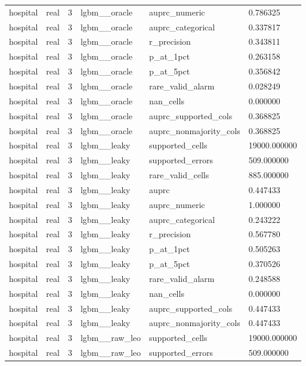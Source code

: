 \begin{tabular}{llllll}
hospital & real & 3 & lgbm\_\_oracle & auprc\_numeric & 0.786325 \\
hospital & real & 3 & lgbm\_\_oracle & auprc\_categorical & 0.337817 \\
hospital & real & 3 & lgbm\_\_oracle & r\_precision & 0.343811 \\
hospital & real & 3 & lgbm\_\_oracle & p\_at\_1pct & 0.263158 \\
hospital & real & 3 & lgbm\_\_oracle & p\_at\_5pct & 0.356842 \\
hospital & real & 3 & lgbm\_\_oracle & rare\_valid\_alarm & 0.028249 \\
hospital & real & 3 & lgbm\_\_oracle & nan\_cells & 0.000000 \\
hospital & real & 3 & lgbm\_\_oracle & auprc\_supported\_cols & 0.368825 \\
hospital & real & 3 & lgbm\_\_oracle & auprc\_nonmajority\_cols & 0.368825 \\
hospital & real & 3 & lgbm\_\_leaky & supported\_cells & 19000.000000 \\
hospital & real & 3 & lgbm\_\_leaky & supported\_errors & 509.000000 \\
hospital & real & 3 & lgbm\_\_leaky & rare\_valid\_cells & 885.000000 \\
hospital & real & 3 & lgbm\_\_leaky & auprc & 0.447433 \\
hospital & real & 3 & lgbm\_\_leaky & auprc\_numeric & 1.000000 \\
hospital & real & 3 & lgbm\_\_leaky & auprc\_categorical & 0.243222 \\
hospital & real & 3 & lgbm\_\_leaky & r\_precision & 0.567780 \\
hospital & real & 3 & lgbm\_\_leaky & p\_at\_1pct & 0.505263 \\
hospital & real & 3 & lgbm\_\_leaky & p\_at\_5pct & 0.370526 \\
hospital & real & 3 & lgbm\_\_leaky & rare\_valid\_alarm & 0.248588 \\
hospital & real & 3 & lgbm\_\_leaky & nan\_cells & 0.000000 \\
hospital & real & 3 & lgbm\_\_leaky & auprc\_supported\_cols & 0.447433 \\
hospital & real & 3 & lgbm\_\_leaky & auprc\_nonmajority\_cols & 0.447433 \\
hospital & real & 3 & lgbm\_\_raw\_leo & supported\_cells & 19000.000000 \\
hospital & real & 3 & lgbm\_\_raw\_leo & supported\_errors & 509.000000 \\

\end{tabular}
